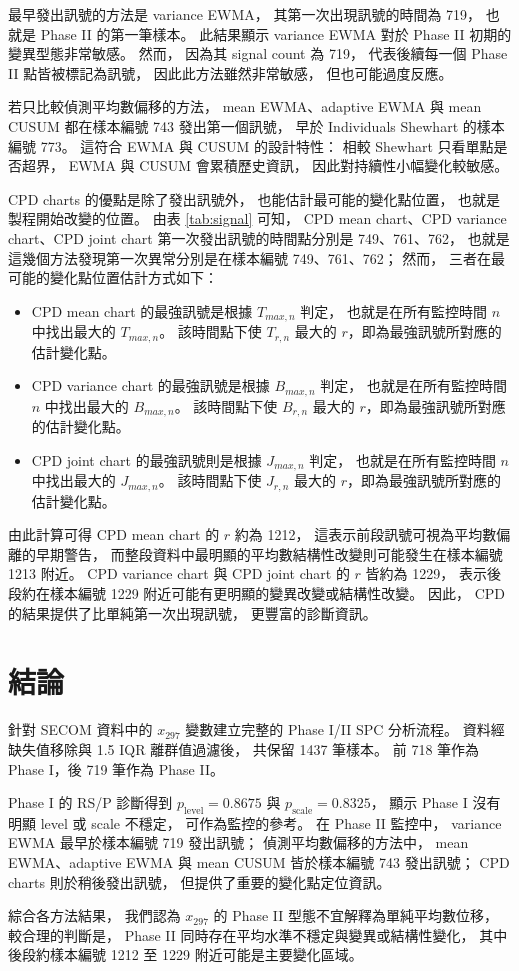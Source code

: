 \documentclass[a4paper, 12pt]{report}  %
\begin{document}
最早發出訊號的方法是 variance EWMA，
其第一次出現訊號的時間為 719，
也就是 Phase II 的第一筆樣本。
此結果顯示 variance EWMA 對於 Phase II 初期的變異型態非常敏感。
然而，
因為其 signal count 為 719，
代表後續每一個 Phase II 點皆被標記為訊號，
因此此方法雖然非常敏感，
但也可能過度反應。

若只比較偵測平均數偏移的方法，
mean EWMA、adaptive EWMA 與 mean CUSUM 都在樣本編號 743 發出第一個訊號，
早於 Individuals Shewhart 的樣本編號 773。
這符合 EWMA 與 CUSUM 的設計特性：
相較 Shewhart 只看單點是否超界，
EWMA 與 CUSUM 會累積歷史資訊，
因此對持續性小幅變化較敏感。

CPD charts 的優點是除了發出訊號外，
也能估計最可能的變化點位置，
也就是製程開始改變的位置。
由表 \ref{tab:signal} 可知，
CPD mean chart、CPD variance chart、CPD joint chart 第一次發出訊號的時間點分別是 749、761、762，
也就是這幾個方法發現第一次異常分別是在樣本編號 749、761、762；
然而，
三者在最可能的變化點位置估計方式如下：

\begin{itemize}
  \item CPD mean chart 的最強訊號是根據 $T_{max,n}$ 判定，
        也就是在所有監控時間 $n$ 中找出最大的 $T_{max,n}$。
        該時間點下使 $T_{r,n}$ 最大的 $r$，即為最強訊號所對應的估計變化點。
  \item CPD variance chart 的最強訊號是根據 $B_{max,n}$ 判定，
        也就是在所有監控時間 $n$ 中找出最大的 $B_{max,n}$。
        該時間點下使 $B_{r,n}$ 最大的 $r$，即為最強訊號所對應的估計變化點。
  \item CPD joint chart 的最強訊號則是根據 $J_{max,n}$ 判定，
        也就是在所有監控時間 $n$ 中找出最大的 $J_{max,n}$。
        該時間點下使 $J_{r,n}$ 最大的 $r$，即為最強訊號所對應的估計變化點。
\end{itemize}

由此計算可得 CPD mean chart 的 $r$ 約為 1212，
這表示前段訊號可視為平均數偏離的早期警告，
而整段資料中最明顯的平均數結構性改變則可能發生在樣本編號 1213 附近。
CPD variance chart 與 CPD joint chart 的 $r$ 皆約為 1229，
表示後段約在樣本編號 1229 附近可能有更明顯的變異改變或結構性改變。
因此，
CPD 的結果提供了比單純第一次出現訊號，
更豐富的診斷資訊。

\chapter{結論}

針對 SECOM 資料中的 \(x_{297}\) 變數建立完整的 Phase I/II SPC 分析流程。
資料經缺失值移除與 1.5 IQR 離群值過濾後，
共保留 1437 筆樣本。
前 718 筆作為 Phase I，後 719 筆作為 Phase II。

Phase I 的 RS/P 診斷得到 \(p_{\text{level}}=0.8675\) 與 \(p_{\text{scale}}=0.8325\)，
顯示 Phase I 沒有明顯 level 或 scale 不穩定，
可作為監控的參考。
在 Phase II 監控中，
variance EWMA 最早於樣本編號 719 發出訊號；
偵測平均數偏移的方法中，
mean EWMA、adaptive EWMA 與 mean CUSUM 皆於樣本編號 743 發出訊號；
CPD charts 則於稍後發出訊號，
但提供了重要的變化點定位資訊。

綜合各方法結果，
我們認為 \(x_{297}\) 的 Phase II 型態不宜解釋為單純平均數位移，
較合理的判斷是，
Phase II 同時存在平均水準不穩定與變異或結構性變化，
其中後段約樣本編號 1212 至 1229 附近可能是主要變化區域。
\end{document}
